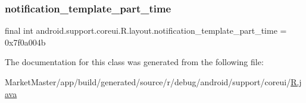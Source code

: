 \subsubsection{\texorpdfstring{notification\+\_\+template\+\_\+part\+\_\+time}{notification\_template\_part\_time}}
{\footnotesize\ttfamily final int android.\+support.\+coreui.\+R.\+layout.\+notification\+\_\+template\+\_\+part\+\_\+time = 0x7f0a004b\hspace{0.3cm}{\ttfamily [static]}}



The documentation for this class was generated from the following file\+:\begin{DoxyCompactItemize}
\item 
Market\+Master/app/build/generated/source/r/debug/android/support/coreui/\mbox{\hyperlink{debug_2android_2support_2coreui_2R_8java}{R.\+java}}\end{DoxyCompactItemize}
